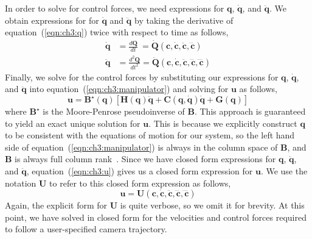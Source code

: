 In order to solve for control forces, we need expressions for $\mathbf{q}$, $\dot{\mathbf{q}}$, and $\ddot{\mathbf{q}}$.
We obtain expressions for for $\dot{\mathbf{q}}$ and $\ddot{\mathbf{q}}$ by taking the derivative of equation~(\ref{eqn:ch3:q}) twice with respect to time as follows,
%
\begin{equation}
\begin{aligned}
\dot{\mathbf{q}}  & = \frac{d \mathbf{Q}}{d t}     ~= \mathbf{\dot{\mathbf{Q}}}(\mathbf{c},\dot{\mathbf{c}},\ddot{\mathbf{c}},\dddot{\mathbf{c}} ) \\
\ddot{\mathbf{q}} & = \frac{d^2 \mathbf{Q}}{d t^2}  = \mathbf{\ddot{\mathbf{Q}}}(\mathbf{c},\dot{\mathbf{c}},\ddot{\mathbf{c}},\dddot{\mathbf{c}},\ddddot{\mathbf{c}} )
\end{aligned}
\label{eqn:ch3:qdotN}
\end{equation}
%
Finally, we solve for the control forces by substituting our expressions for $\mathbf{q}$, $\dot{\mathbf{q}}$, and $\ddot{\mathbf{q}}$ into equation~(\ref{eqn:ch3:manipulator}) and solving for $\mathbf{u}$ as follows,
%
\begin{equation}
\mathbf{u} = \mathbf{B}^{\star}(\mathbf{q}) \left[\mathbf{H}(\mathbf{q}) \ddot{\mathbf{q}} + \mathbf{C}(\mathbf{q},\dot{\mathbf{q}}) \dot{\mathbf{q}} + \mathbf{G}(\mathbf{q})\right]
\label{eqn:ch3:u}
\end{equation}
%
where $\mathbf{B}^{\star}$ is the Moore-Penrose pseudoinverse of $\mathbf{B}$.
This approach is guaranteed to yield an exact unique solution for $\mathbf{u}$.
This is because we explicitly construct $\mathbf{q}$ to be consistent with the equations of motion for our system, so the left hand side of equation~(\ref{eqn:ch3:manipulator}) is always in the column space of $\mathbf{B}$, and $\mathbf{B}$ is always full column rank~\cite{joubert:2015}.
Since we have closed form expressions for $\mathbf{q}$, $\dot{\mathbf{q}}$, and $\ddot{\mathbf{q}}$, equation~(\ref{eqn:ch3:u}) gives us a closed form expression for $\mathbf{u}$.
We use the notation $\mathbf{U}$ to refer to this closed form expression as follows,
%
\begin{equation}
\mathbf{u} = \mathbf{U}(\mathbf{c},\dot{\mathbf{c}},\ddot{\mathbf{c}},\dddot{\mathbf{c}},\ddddot{\mathbf{c}} )
\label{eqn:ch3:uc}
\end{equation}
%
Again, the explicit form for $\mathbf{U}$ is quite verbose, so we omit it for brevity.
At this point, we have solved in closed form for the velocities and control forces required to follow a user-specified camera trajectory.


